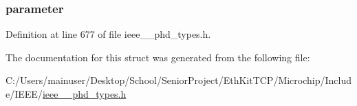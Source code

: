 \hypertarget{struct___error_result_aa1d8f12c642ce2b58d3af3dbcd2c6094}{}
\subsubsection[{parameter}]{ parameter}\label{struct___error_result_aa1d8f12c642ce2b58d3af3dbcd2c6094}


Definition at line 677 of file ieee\+\_\+\_\+phd\+\_\+types.\+h.



The documentation for this struct was generated from the following file\+:\begin{DoxyCompactItemize}
\item 
C\+:/\+Users/mainuser/\+Desktop/\+School/\+Senior\+Project/\+Eth\+Kit\+T\+C\+P/\+Microchip/\+Include/\+I\+E\+E\+E/\hyperlink{ieee__11073__phd__types_8h}{ieee\+\_\+\_\+phd\+\_\+types.\+h}\end{DoxyCompactItemize}
